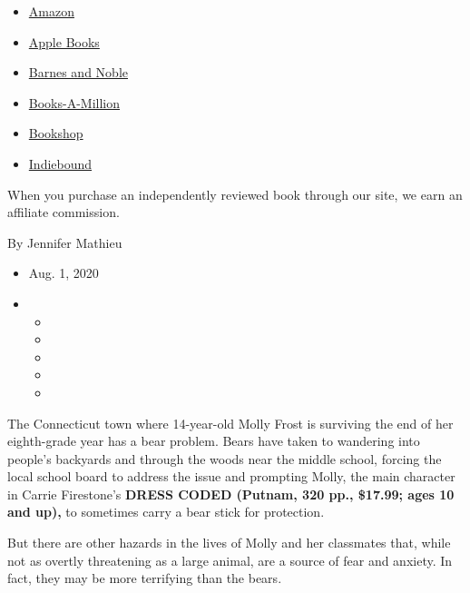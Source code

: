 \begin{itemize}
\tightlist
\item
  \href{https://www.amazon.com/gp/search?index=books\&tag=NYTBSREV-20\&field-keywords=Dress+Coded+Carrie+Firestone}{Amazon}
\item
  \href{https://du-gae-books-dot-nyt-du-prd.appspot.com/buy?title=Dress+Coded\&author=Carrie+Firestone}{Apple
  Books}
\item
  \href{https://www.anrdoezrs.net/click-7990613-11819508?url=https\%3A\%2F\%2Fwww.barnesandnoble.com\%2Fw\%2F\%3Fean\%3D9781984816436}{Barnes
  and Noble}
\item
  \href{https://www.anrdoezrs.net/click-7990613-35140?url=https\%3A\%2F\%2Fwww.booksamillion.com\%2Fp\%2FDress\%2BCoded\%2FCarrie\%2BFirestone\%2F9781984816436}{Books-A-Million}
\item
  \href{https://bookshop.org/a/3546/9781984816436}{Bookshop}
\item
  \href{https://www.indiebound.org/book/9781984816436?aff=NYT}{Indiebound}
\end{itemize}

When you purchase an independently reviewed book through our site, we
earn an affiliate commission.

By Jennifer Mathieu

\begin{itemize}
\item
  Aug. 1, 2020
\item
  \begin{itemize}
  \item
  \item
  \item
  \item
  \item
  \end{itemize}
\end{itemize}

The Connecticut town where 14-year-old Molly Frost is surviving the end
of her eighth-grade year has a bear problem. Bears have taken to
wandering into people's backyards and through the woods near the middle
school, forcing the local school board to address the issue and
prompting Molly, the main character in Carrie Firestone's \textbf{DRESS
CODED (Putnam, 320 pp., \$17.99; ages 10 and up),} to sometimes carry a
bear stick for protection.

But there are other hazards in the lives of Molly and her classmates
that, while not as overtly threatening as a large animal, are a source
of fear and anxiety. In fact, they may be more terrifying than the
bears.

